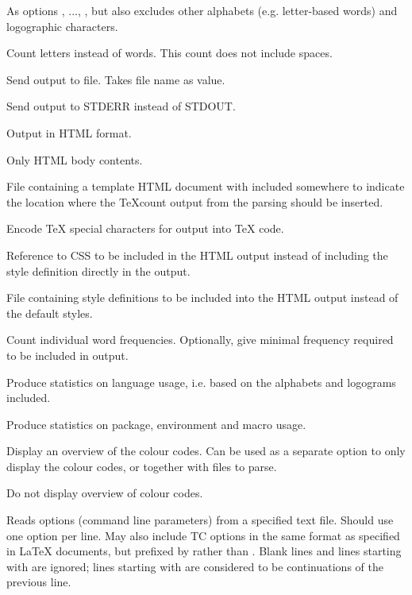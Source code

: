 \begin{description}
As options , ..., , but also excludes other alphabets (e.g. letter-based words) and logographic characters.

Count letters instead of words. This count does not include spaces.

\option[-out=]Send output to file. Takes file name as value.

Send output to STDERR instead of STDOUT.

\option[-html]Output in HTML format.

\option[-htmlcore]Only HTML body contents.

\option[-htmlfile=]File containing a template HTML document with  included somewhere to indicate the location where the TeXcount output from the parsing should be inserted.

\option[-tex]Encode \TeX{} special characters for output into \TeX{} code.

\option[-css=]Reference to CSS to be included in the HTML output instead of including the style definition directly in the output.

\option[-cssfile=, -css=file:]File containing style definitions to be included into the HTML output instead of the default styles.

\option[-freq\alt{=\#}]Count individual word frequencies. Optionally, give minimal frequency required to be included in output.

\option[-stat]Produce statistics on language usage, i.e. based on the alphabets and logograms included.

Produce statistics on package, environment and macro usage. 

\option[-codes]Display an overview of the colour codes. Can be used as a separate option to only display the colour codes, or together with files to parse.

\option[-nocodes]Do not display overview of colour codes.

\option[-opt=, -optionfile=]Reads options (command line parameters) from a specified text file. Should use one option per line. May also include TC options in the same format as specified in \LaTeX{} documents, but prefixed by \code{\%} rather than . Blank lines and lines starting with \code{\#} are ignored; lines starting with \code{\bs{}} are considered to be continuations of the previous line.


\end{description}

